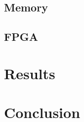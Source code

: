 \documentclass{beamer}
\begin{document}
\begin{frame}
	\frametitle{}
\end{frame}


\subsection{Memory}

\begin{frame}
	\frametitle{}
\end{frame}


\subsection{FPGA}

\begin{frame}
	\frametitle{}
\end{frame}


\section{Results}

\begin{frame}
	\frametitle{}
\end{frame}


\section{Conclusion}

\begin{frame}
	\frametitle{}
\end{frame}


\begin{frame}
	\frametitle{}
	\printbibliography
\end{frame}
\end{document}
